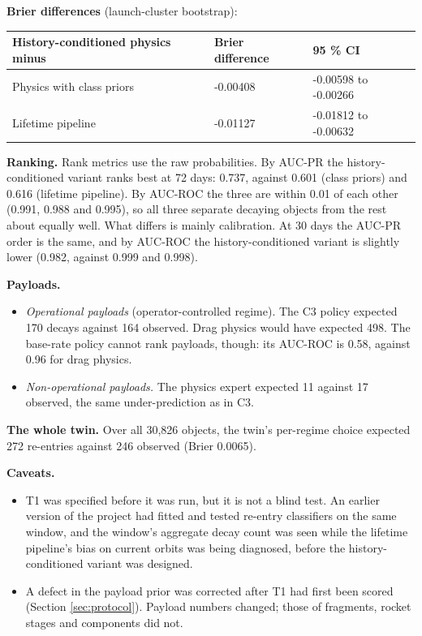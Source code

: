 \documentclass[
]{article}
\newcounter{none} %
\providecommand{\tightlist}{%
  \setlength{\itemsep}{0pt}\setlength{\parskip}{0pt}}
\begin{document}
\textbf{Brier differences} (launch-cluster bootstrap):

{\def\LTcaptype{none} %
\begin{longtable}[]{@{}lll@{}}
\toprule\noalign{}
History-conditioned physics minus & Brier difference & 95 \% CI \\
\midrule\noalign{}
\endhead
\bottomrule\noalign{}
\endlastfoot
Physics with class priors & -0.00408 & -0.00598 to -0.00266 \\
Lifetime pipeline & -0.01127 & -0.01812 to -0.00632 \\
\end{longtable}
}

\textbf{Ranking.} Rank metrics use the raw probabilities. By AUC-PR the
history-conditioned variant ranks best at 72 days: 0.737, against 0.601
(class priors) and 0.616 (lifetime pipeline). By AUC-ROC the three are
within 0.01 of each other (0.991, 0.988 and 0.995), so all three
separate decaying objects from the rest about equally well. What differs
is mainly calibration. At 30 days the AUC-PR order is the same, and by
AUC-ROC the history-conditioned variant is slightly lower (0.982,
against 0.999 and 0.998).

\textbf{Payloads.}

\begin{itemize}
\tightlist
\item
  \emph{Operational payloads} (operator-controlled regime). The C3
  policy expected 170 decays against 164 observed. Drag physics would
  have expected 498. The base-rate policy cannot rank payloads, though:
  its AUC-ROC is 0.58, against 0.96 for drag physics.
\item
  \emph{Non-operational payloads.} The physics expert expected 11
  against 17 observed, the same under-prediction as in C3.
\end{itemize}

\textbf{The whole twin.} Over all 30,826 objects, the twin's per-regime
choice expected 272 re-entries against 246 observed (Brier 0.0065).

\textbf{Caveats.}

\begin{itemize}
\tightlist
\item
  T1 was specified before it was run, but it is not a blind test. An
  earlier version of the project had fitted and tested re-entry
  classifiers on the same window, and the window's aggregate decay count
  was seen while the lifetime pipeline's bias on current orbits was
  being diagnosed, before the history-conditioned variant was designed.
\item
  A defect in the payload prior was corrected after T1 had first been
  scored (Section \ref{sec:protocol}). Payload numbers changed; those of
  fragments, rocket stages and components did not.
\end{itemize}
\end{document}
